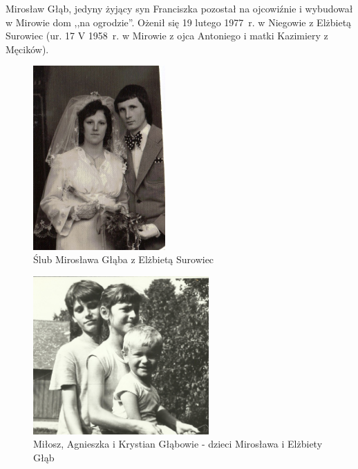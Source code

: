 Mirosław Głąb, jedyny żyjący syn Franciszka pozostał na ojcowiźnie i wybudował w Mirowie dom ,,na ogrodzie''. Ożenił się 19 lutego 1977~r. w Niegowie z Elżbietą Surowiec (ur. 17 V 1958~r. w Mirowie z ojca Antoniego i matki Kazimiery z Męcików).

\begin{figure}[!h]
\begin{center}
\includegraphics[width=0.45\textwidth]{zdjecia/slub_miroslawa_i_elzbiety_glabow.jpg}
\caption{Ślub Mirosława Głąba z Elżbietą Surowiec}
\label{rys:slub_miroslawa_i_elzbiety_glabow}
\end{center}
\end{figure}

\begin{figure}[!h]
\begin{center}
\includegraphics[width=0.6\textwidth]{zdjecia/dzieci_miroslawa_glaba.jpg}
\caption[Miłosz, Agnieszka i Krystian Głąbowie]{Miłosz, Agnieszka i Krystian Głąbowie - dzieci Mirosława i Elżbiety Głąb}
\label{rys:dzieci_miroslawa_glaba}
\end{center}
\end{figure}

